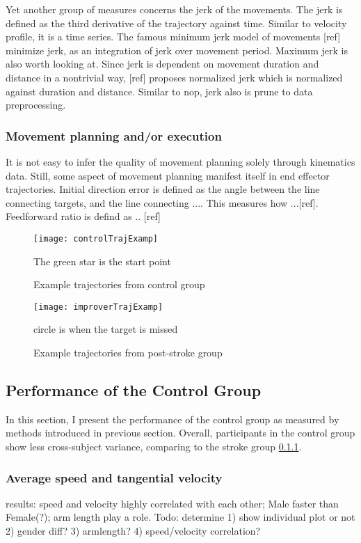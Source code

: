 Yet another group of measures concerns the jerk of the movements. The jerk is defined as the third derivative of the trajectory against time. Similar to velocity profile, it is a time series. The famous minimum jerk model of movements [ref] minimize jerk, as an integration of jerk over movement period. Maximum jerk is also worth looking at. Since jerk is dependent on movement duration and distance in a nontrivial way, [ref] proposes normalized jerk which is normalized against duration and distance. Similar to nop, jerk also is prune to data preprocessing.

\subsubsection{Movement planning and/or execution}
It is not easy to infer the quality of movement planning solely through kinematics data. Still, some aspect of movement planning manifest itself in end effector trajectories. Initial direction error is defined as the angle between the line connecting targets, and the line connecting .... This measures how ...[ref]. Feedforward ratio is defind as .. [ref]




\begin{figure}
	\texttt{[image: controlTrajExamp]}
	\centering
	\caption{Example trajectories from control group}
	\medskip
	\small The green star is the start point
	\label{fig:controlTrajExamp}
\end{figure}

\begin{figure}
	\texttt{[image: improverTrajExamp]}
	\centering
	\caption{Example trajectories from post-stroke group}
	\medskip
	\small circle is when the target is missed
	\label{fig:improverTrajExamp}
\end{figure}

\subsection{Performance of the Control Group}

In this section, I present the performance of the control group as measured by methods introduced in previous section. Overall, participants in the control group show less cross-subject variance, comparing to the stroke group \ref{}. 

\subsubsection{Average speed and tangential velocity}
results: speed and velocity highly correlated with each other; Male faster than Female(?); arm length play a role. Todo: determine 1) show individual plot or not 2) gender diff? 3) armlength? 4) speed/velocity correlation?

